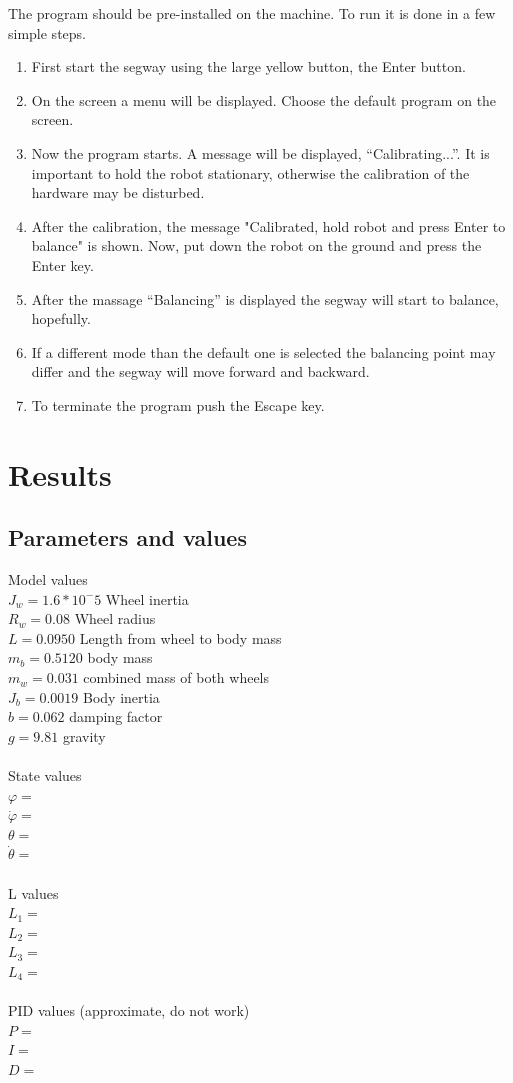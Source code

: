 \documentclass[a4paper]{article}
\begin{document}
The program should be pre-installed on the machine. To run it is done in a few simple steps. 

\begin{enumerate}
\item First start the segway using the large yellow button, the Enter button.
\item On the screen a menu will be displayed. Choose the default program on the screen.
\item Now the program starts. A message will be displayed, “Calibrating...”. It is important to hold the robot stationary, otherwise the calibration of the hardware may be disturbed.
\item After the calibration, the message "Calibrated, hold robot and press Enter to balance" is shown. Now, put down the robot on the ground and press the Enter key.
\item After the massage “Balancing” is displayed the segway will start to balance, hopefully. 
\item If a different mode than the default one is selected the balancing point may differ and the segway will move forward and backward.
\item To terminate the program push the Escape key.
\end{enumerate}

\section{Results}
\subsection{Parameters and values}
Model values\\
$J_w = 1.6*10^-5$ Wheel inertia \\
$R_w = 0.08$ Wheel radius \\
$L = 0.0950$ Length from wheel to body mass \\
$m_b = 0.5120$ body mass \\
$m_w = 0.031$ combined mass of both wheels \\
$J_b = 0.0019$ Body inertia \\
$b = 0.062$ damping factor \\
$g = 9.81$ gravity \\ \\
State values\\
$\varphi=$\\
$\dot{\varphi}=$ \\
$\theta=$\\
$\dot{\theta}=$\\ \\
L values\\
$L_1=$\\
$L_2=$\\
$L_3=$\\
$L_4=$\\ \\
PID values (approximate, do not work)\\ 
$P=$\\
$I=$\\
$D=$\\
\end{document}
